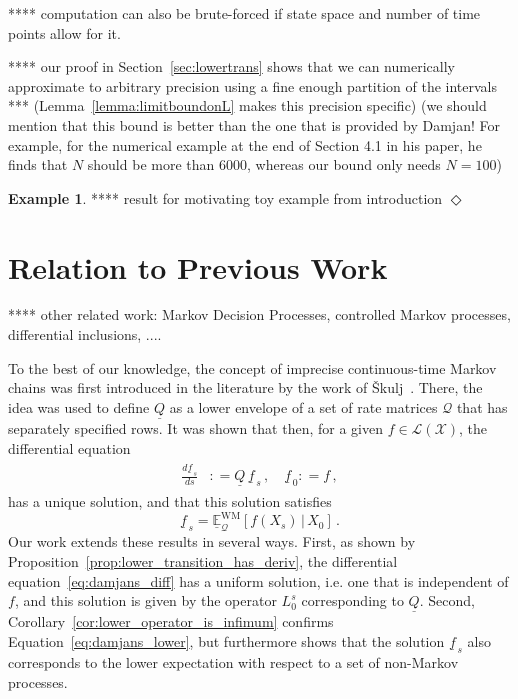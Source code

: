 \documentclass[10pt,a4paper]{paper}
\theoremstyle{definition}
\newtheorem{exmp}{Example}%
\newcommand{\states}{\mathcal{X}}
\newcommand{\gambles}{\mathcal{L}}
\newcommand{\gamblesX}{\gambles(\states)}
\newcommand{\rateset}{\mathcal{Q}}
\newcommand{\lrate}{\underline{Q}}
\newcommand{\coloneqq}{:\!=}
\newcommand{\exampleend}{\hfill$\Diamond$}
\begin{document}
**** computation can also be brute-forced if state space and number of time points allow for it.

**** our proof in Section~\ref{sec:lowertrans} shows that we can numerically approximate to arbitrary precision using a fine enough partition of the intervals *** (Lemma~\ref{lemma:limitboundonL} makes this precision specific) (we should mention that this bound is better than the one that is provided by Damjan! For example, for the numerical example at the end of Section 4.1 in his paper, he finds that $N$ should be more than $6000$, whereas our bound only needs $N=100$)

\begin{exmp}
**** result for motivating toy example from introduction
\exampleend
\end{exmp}

\section{Relation to Previous Work}\label{sec:prev_work}

**** other related work: Markov Decision Processes, controlled Markov processes, differential inclusions, ....

To the best of our knowledge, the concept of imprecise continuous-time Markov chains was first introduced in the literature by the work of {\v{S}}kulj~\cite{Skulj:2015cq}. There, the idea was used to define $\lrate$ as a lower envelope of a set of rate matrices $\rateset$ that has separately specified rows. It was shown that then, for a given $f\in\gamblesX$, the differential equation
\begin{align}\label{eq:damjans_diff}
\begin{split}
\frac{d \underline{f}_{\,s}}{d s} &\coloneqq \lrate\,\underline{f}_{\,s}\,,\quad
\underline{f}_{\,0} \coloneqq f\,,
\end{split}
\end{align}
has a unique solution, and that this solution satisfies
\begin{equation}\label{eq:damjans_lower}
\underline{f}_{\,s} = \underline{\mathbb{E}}_{\rateset}^{\mathrm{WM}}[f(X_s)\,\vert\,X_0]\,.
\end{equation}
Our work extends these results in several ways. First, as shown by Proposition~\ref{prop:lower_transition_has_deriv}, the differential equation~\eqref{eq:damjans_diff} has a uniform solution, i.e. one that is independent of $f$, and this solution is given by the operator $L_0^s$ corresponding to $\lrate$. Second, Corollary~\ref{cor:lower_operator_is_infimum} confirms Equation~\eqref{eq:damjans_lower}, but furthermore shows that the solution $\underline{f}_{\,s}$ also corresponds to the lower expectation with respect to a set of non-Markov processes.
\end{document}
